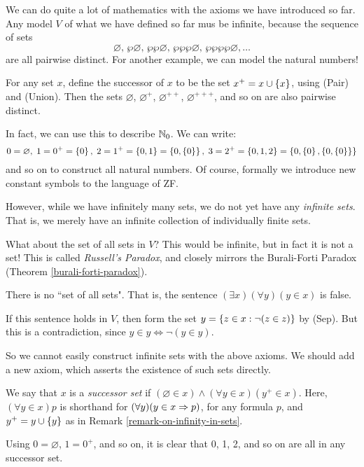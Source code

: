 \documentclass{article}
\begin{document}
\begin{remark}[Infinity]
	\label{remark-on-infinity-in-sets}
    We can do quite a lot of mathematics with the axioms we have introduced so far. Any model $V$ of what we have defined so far mus be infinite, because the sequence of sets
	\[
	\varnothing, \, \wp\varnothing, \, \wp\wp\varnothing, \, \wp\wp\wp\varnothing, \, \wp\wp\wp\wp\varnothing, \dots
	\]
	are all pairwise distinct. For another example, we can model the natural numbers!
	
	For any set $x$, define the successor of $x$ to be the set $x^+ = x \cup \left\lbrace x \right\rbrace$, using (Pair) and (Union). Then the sets $\varnothing$, $\varnothing^{+}$, $\varnothing^{++}$, $\varnothing^{+++}$, and so on are also pairwise distinct.
	
	In fact, we can use this to describe $\mathbb{N}_0$. We can write:
	\[
	0 = \varnothing, \;
	1 = 0^+ = \left\lbrace 0 \right\rbrace, \;
	2 = 1^+ = \left\lbrace 0, 1 \right\rbrace = \left\lbrace 0, \left\lbrace 0 \right\rbrace \right\rbrace, \;
	3 = 2^+ = \left\lbrace 0, 1, 2 \right\rbrace = \left\lbrace 0, \left\lbrace 0 \right\rbrace, \left\lbrace 0, \left\lbrace 0 \right\rbrace \right\rbrace \right\rbrace
	\]
	and so on to construct all natural numbers. Of course, formally we introduce new constant symbols to the language of ZF.
	
	However, while we have infinitely many sets, we do not yet have any \textit{infinite sets}. That is, we merely have an infinite collection of individually finite sets.
\end{remark}

What about the set of all sets in $V$? This would be infinite, but in fact it is not a set! This is called \textit{Russell's Paradox}, and closely mirrors the Burali-Forti Paradox (Theorem \ref{burali-forti-paradox}).

\begin{theorem}
	\label{russells-paradox}
	There is no ``set of all sets". That is, the sentence $(\exists x)(\forall y)(y \in x)$ is false.
\end{theorem}

\begin{prf}
	If this sentence holds in $V$, then form the set $y = \left\lbrace z \in x : \lnot(z \in z) \right\rbrace$ by (Sep). But this is a contradiction, since $y \in y \iff \lnot(y \in y)$.
\end{prf}

So we cannot easily construct infinite sets with the above axioms. We should add a new axiom, which asserts the existence of such sets directly.

\begin{definition}
    We say that $x$ is a \textit{successor set} if $(\varnothing \in x) \land (\forall y \in x)(y^+ \in x)$. Here, $(\forall y \in x)p$ is shorthand for $(\forall y)(y \in x \Rightarrow p)$, for any formula $p$, and $y^+ = y \cup \left\lbrace y \right\rbrace$ as in Remark \ref{remark-on-infinity-in-sets}.
    
    Using $0 = \varnothing$, $1 = 0^+$, and so on, it is clear that 0, 1, 2, and so on are all in any successor set.
\end{definition}
\end{document}
